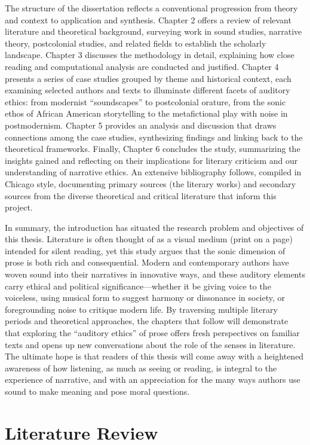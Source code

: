 \documentclass[12pt]{report}
\begin{document}
The structure of the dissertation reflects a conventional progression from theory and context to application and synthesis. Chapter 2 offers a review of relevant literature and theoretical background, surveying work in sound studies, narrative theory, postcolonial studies, and related fields to establish the scholarly landscape. Chapter 3 discusses the methodology in detail, explaining how close reading and computational analysis are conducted and justified. Chapter 4 presents a series of case studies grouped by theme and historical context, each examining selected authors and texts to illuminate different facets of auditory ethics: from modernist “soundscapes” to postcolonial orature, from the sonic ethos of African American storytelling to the metafictional play with noise in postmodernism. Chapter 5 provides an analysis and discussion that draws connections among the case studies, synthesizing findings and linking back to the theoretical frameworks. Finally, Chapter 6 concludes the study, summarizing the insights gained and reflecting on their implications for literary criticism and our understanding of narrative ethics. An extensive bibliography follows, compiled in Chicago style, documenting primary sources (the literary works) and secondary sources from the diverse theoretical and critical literature that inform this project.

In summary, the introduction has situated the research problem and objectives of this thesis. Literature is often thought of as a visual medium (print on a page) intended for silent reading, yet this study argues that the sonic dimension of prose is both rich and consequential. Modern and contemporary authors have woven sound into their narratives in innovative ways, and these auditory elements carry ethical and political significance—whether it be giving voice to the voiceless, using musical form to suggest harmony or dissonance in society, or foregrounding noise to critique modern life. By traversing multiple literary periods and theoretical approaches, the chapters that follow will demonstrate that exploring the “auditory ethics” of prose offers fresh perspectives on familiar texts and opens up new conversations about the role of the senses in literature. The ultimate hope is that readers of this thesis will come away with a heightened awareness of how listening, as much as seeing or reading, is integral to the experience of narrative, and with an appreciation for the many ways authors use sound to make meaning and pose moral questions.

\chapter{Literature Review}
\end{document}
